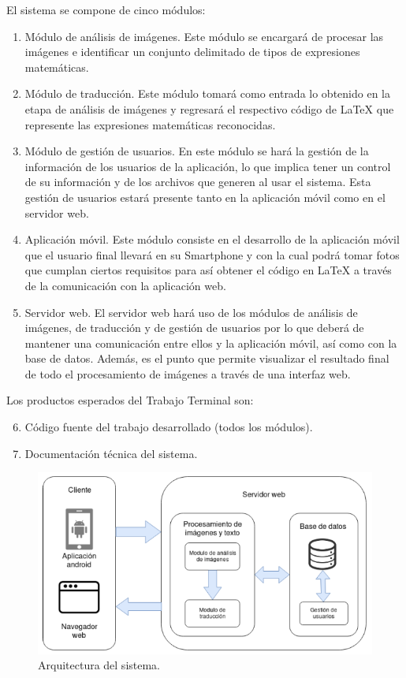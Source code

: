 El sistema se compone de cinco módulos:
\begin{enumerate}
    \item Módulo de análisis de imágenes. Este módulo se encargará de procesar las imágenes e identificar un conjunto delimitado de tipos de expresiones matemáticas.
    \item Módulo de traducción. Este módulo tomará como entrada lo obtenido en la etapa de análisis de imágenes y regresará el respectivo código de LaTeX que represente las expresiones matemáticas reconocidas.
    
    \item Módulo de gestión de usuarios. En este módulo se hará la gestión de la información de los usuarios de la aplicación, lo que implica tener un control de su información y de los archivos que generen al usar el sistema. Esta gestión de usuarios estará presente tanto en la aplicación móvil como en el servidor web.

    \item Aplicación móvil. Este módulo consiste en el desarrollo de la aplicación móvil que el usuario final llevará en su Smartphone y con la cual podrá tomar fotos que cumplan ciertos requisitos para así obtener el código en LaTeX a través de la comunicación con la aplicación web.

    \item Servidor web. El servidor web hará uso de los módulos de análisis de imágenes, de traducción y de gestión de usuarios por lo que deberá de mantener una comunicación entre ellos y la aplicación móvil, así como con la base de datos. Además, es el punto que permite visualizar el resultado final de todo el procesamiento de imágenes a través de una interfaz web.
\end{enumerate}
Los productos esperados del Trabajo Terminal son:
\begin{enumerate}
    \setcounter{enumi}{5}
    \item Código fuente del trabajo desarrollado (todos los módulos).
    \item Documentación técnica del sistema.
\end{enumerate}

\begin{figure}[h]
\centering
\includegraphics[width=1.0\textwidth]{capitulo1/images/arquitectura.png}
\caption{Arquitectura del sistema.}
\label{fig:arquitectura}
\end{figure}
\newpage

